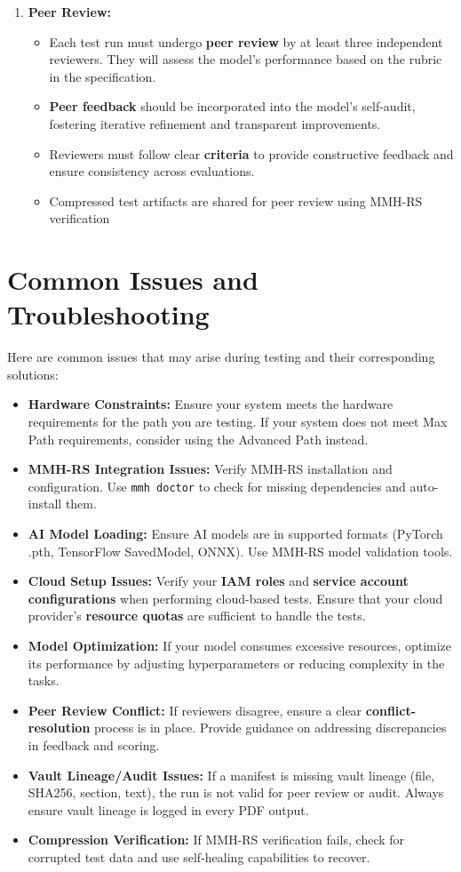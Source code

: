 \begin{enumerate}
  \item \textbf{Peer Review:}
  \begin{itemize}
    \item Each test run must undergo \textbf{peer review} by at least three independent reviewers. They will assess the model's performance based on the rubric in the specification.
    \item \textbf{Peer feedback} should be incorporated into the model's self-audit, fostering iterative refinement and transparent improvements.
    \item Reviewers must follow clear \textbf{criteria} to provide constructive feedback and ensure consistency across evaluations.
    \item Compressed test artifacts are shared for peer review using MMH-RS verification
  \end{itemize}
\end{enumerate}

\section*{Common Issues and Troubleshooting}
Here are common issues that may arise during testing and their corresponding solutions:

\begin{itemize}
  \item \textbf{Hardware Constraints:} Ensure your system meets the hardware requirements for the path you are testing. If your system does not meet Max Path requirements, consider using the Advanced Path instead.
  \item \textbf{MMH-RS Integration Issues:} Verify MMH-RS installation and configuration. Use \texttt{mmh doctor} to check for missing dependencies and auto-install them.
  \item \textbf{AI Model Loading:} Ensure AI models are in supported formats (PyTorch .pth, TensorFlow SavedModel, ONNX). Use MMH-RS model validation tools.
  \item \textbf{Cloud Setup Issues:} Verify your \textbf{IAM roles} and \textbf{service account configurations} when performing cloud-based tests. Ensure that your cloud provider's \textbf{resource quotas} are sufficient to handle the tests.
  \item \textbf{Model Optimization:} If your model consumes excessive resources, optimize its performance by adjusting hyperparameters or reducing complexity in the tasks.
  \item \textbf{Peer Review Conflict:} If reviewers disagree, ensure a clear \textbf{conflict-resolution} process is in place. Provide guidance on addressing discrepancies in feedback and scoring.
  \item \textbf{Vault Lineage/Audit Issues:} If a manifest is missing vault lineage (file, SHA256, section, text), the run is not valid for peer review or audit. Always ensure vault lineage is logged in every PDF output.
  \item \textbf{Compression Verification:} If MMH-RS verification fails, check for corrupted test data and use self-healing capabilities to recover.
\end{itemize}

